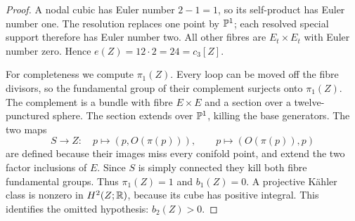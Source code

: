 \begin{proof}
A nodal cubic has Euler number $2-1=1$, so its self-product has
Euler number one. The resolution replaces one point by $\mathbb P^1$;
each resolved special support therefore has Euler number two.
All other fibres are $E_t\times E_t$ with Euler number zero.
Hence $e(Z)=12\cdot2=24=c_3[Z]$.

For completeness we compute $\pi_1(Z)$. Every loop can be moved
off the fibre divisors, so the fundamental group of their complement
surjects onto $\pi_1(Z)$. The complement is a bundle with fibre
$E\times E$ and a section over a twelve-punctured sphere. The
section extends over $\mathbb P^1$, killing the base generators. The
two maps
\[
 S\longrightarrow Z:\quad p\mapsto(p,O(\pi(p))),\qquad
 p\mapsto(O(\pi(p)),p)
\]
are defined because their images miss every conifold point, and
extend the two factor inclusions of $E$. Since $S$ is simply
connected they kill both fibre fundamental groups. Thus
$\pi_1(Z)=1$ and $b_1(Z)=0$. A projective Kähler class is nonzero
in $H^2(Z;\mathbb R)$, because its cube has positive integral. This
identifies the omitted hypothesis: $b_2(Z)>0$.
\end{proof}

